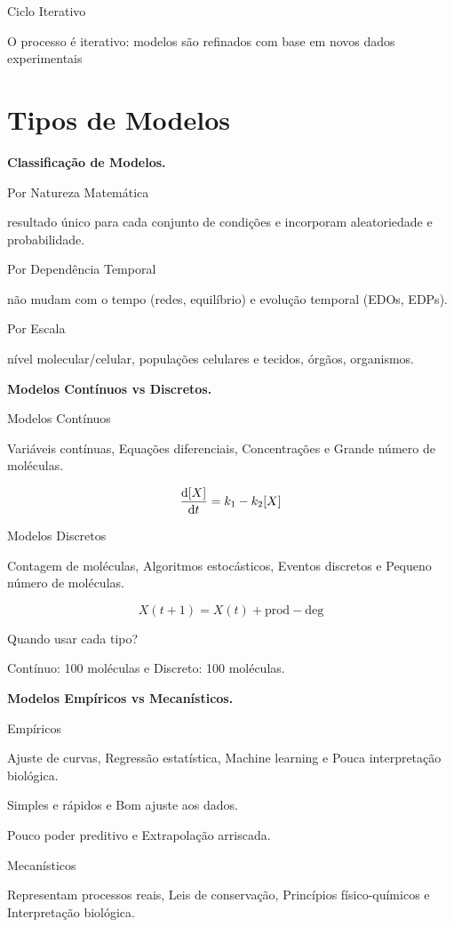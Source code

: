 Ciclo Iterativo

O processo é iterativo: modelos são refinados com base em novos dados experimentais

\section{Tipos de Modelos}

\textbf{Classificação de Modelos.}

Por Natureza Matemática

resultado único para cada conjunto de condições e incorporam aleatoriedade e probabilidade.

Por Dependência Temporal

não mudam com o tempo (redes, equilíbrio) e evolução temporal (EDOs, EDPs).

Por Escala

nível molecular/celular, populações celulares e tecidos, órgãos, organismos.

\textbf{Modelos Contínuos vs Discretos.}

Modelos Contínuos

Variáveis contínuas, Equações diferenciais, Concentrações e Grande número de moléculas.

%
\begin{equation*}
\frac{\mathrm{d} [X]}{\mathrm{d} t} = k_1 - k_2[X]
\end{equation*}
%

Modelos Discretos

Contagem de moléculas, Algoritmos estocásticos, Eventos discretos e Pequeno número de moléculas.

%
\begin{equation*}
X(t+1) = X(t) + \text{prod} - \text{deg}
\end{equation*}
%

Quando usar cada tipo?

Contínuo: 100 moléculas e Discreto: 100 moléculas.

\textbf{Modelos Empíricos vs Mecanísticos.}

Empíricos

Ajuste de curvas, Regressão estatística, Machine learning e Pouca interpretação biológica.

Simples e rápidos e Bom ajuste aos dados.

Pouco poder preditivo e Extrapolação arriscada.

Mecanísticos

Representam processos reais, Leis de conservação, Princípios físico-químicos e Interpretação biológica.

